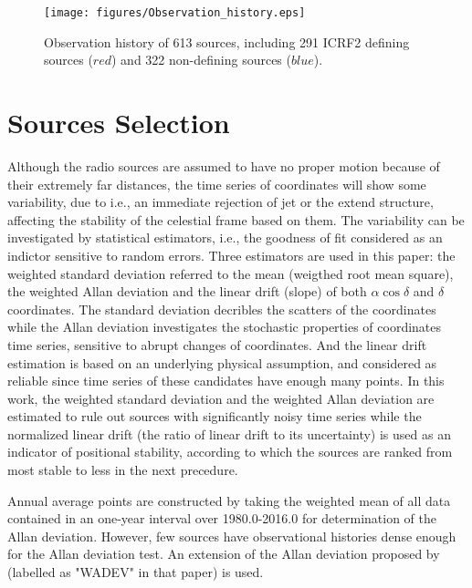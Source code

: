 \documentclass{aa}
\begin{document}
\begin{figure}
   \centering
   \texttt{[image: figures/Observation\_history.eps]}
      \caption{
      Observation history of 613 sources, including 291 ICRF2 defining sources ($red$) and 322 non-defining sources ($blue$).
              }
         \label{Fig:ObsHis}
\end{figure}

\section{Sources Selection}\label{sect:select}
Although the radio sources are assumed to have no proper motion because of their extremely far distances, the time series of coordinates will show some variability, due to i.e., an immediate rejection of jet or the extend structure, affecting the stability of the celestial frame based on them. The variability can be investigated by statistical estimators, i.e., the goodness of fit considered as an indictor sensitive to random errors. Three estimators are used in this paper: the weighted standard deviation referred to the mean (weigthed root mean square), the weighted Allan deviation and the linear drift (slope) of both $\alpha\cos\delta$ and $\delta$ coordinates. The standard deviation decribles the scatters of the coordinates while the Allan deviation investigates the stochastic properties of coordinates time series, sensitive to abrupt changes of coordinates. And the linear drift estimation is based on an underlying physical assumption, and considered as reliable since time series of these candidates have enough many points. In this work, the weighted standard deviation and the weighted Allan deviation are estimated to rule out sources with significantly noisy time series while the normalized linear drift (the ratio of linear drift to its uncertainty) is used as an indicator of positional stability, according to which the sources are ranked from most stable to less in the next precedure.

Annual average points are constructed by taking the weighted mean of all data contained in an one-year interval over 1980.0-2016.0 for determination of the Allan deviation. However, few sources have observational histories dense enough for the Allan deviation test. An extension of the Allan deviation proposed by \cite{Malkin2008} (labelled as "WADEV" in that paper) is used. 
\end{document}
